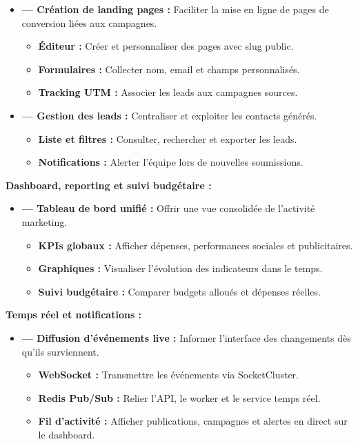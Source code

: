\documentclass[12pt,a4paper]{report}
\numberwithin{figure}{chapter}
\numberwithin{table}{chapter}
\begin{document}
\begin{itemize}[leftmargin=2em,itemsep=6pt]
\item[] \textbf{--- Création de landing pages :} Faciliter la mise en ligne de pages de conversion liées aux campagnes.
\begin{itemize}[label=$\checkmark$,leftmargin=2em,itemsep=3pt]
\item \textbf{Éditeur :} Créer et personnaliser des pages avec slug public.
\item \textbf{Formulaires :} Collecter nom, email et champs personnalisés.
\item \textbf{Tracking UTM :} Associer les leads aux campagnes sources.
\end{itemize}

\item[] \textbf{--- Gestion des leads :} Centraliser et exploiter les contacts générés.
\begin{itemize}[label=$\checkmark$,leftmargin=2em,itemsep=3pt]
\item \textbf{Liste et filtres :} Consulter, rechercher et exporter les leads.
\item \textbf{Notifications :} Alerter l’équipe lors de nouvelles soumissions.
\end{itemize}
\end{itemize}

\textbf{Dashboard, reporting et suivi budgétaire :}

\begin{itemize}[leftmargin=2em,itemsep=6pt]
\item[] \textbf{--- Tableau de bord unifié :} Offrir une vue consolidée de l’activité marketing.
\begin{itemize}[label=$\checkmark$,leftmargin=2em,itemsep=3pt]
\item \textbf{KPIs globaux :} Afficher dépenses, performances sociales et publicitaires.
\item \textbf{Graphiques :} Visualiser l’évolution des indicateurs dans le temps.
\item \textbf{Suivi budgétaire :} Comparer budgets alloués et dépenses réelles.
\end{itemize}
\end{itemize}

\textbf{Temps réel et notifications :}

\begin{itemize}[leftmargin=2em,itemsep=6pt]
\item[] \textbf{--- Diffusion d’événements live :} Informer l’interface des changements dès qu’ils surviennent.
\begin{itemize}[label=$\checkmark$,leftmargin=2em,itemsep=3pt]
\item \textbf{WebSocket :} Transmettre les événements via SocketCluster.
\item \textbf{Redis Pub/Sub :} Relier l’API, le worker et le service temps réel.
\item \textbf{Fil d’activité :} Afficher publications, campagnes et alertes en direct sur le dashboard.
\end{itemize}
\end{itemize}
\end{document}
